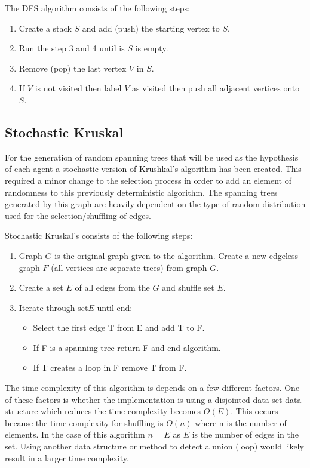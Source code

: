 \documentclass{AISB2008}
\begin{document}
The DFS algorithm consists of the following steps:

\begin{enumerate}
\item Create a stack {$S$} and add (push) the starting vertex to {$S$}.
\item Run the step 3 and 4 until is {$S$} is empty.
\item Remove (pop) the last vertex {$V$} in {$S$}.
\item If {$V$} is not visited then label {$V$} as visited then push all adjacent vertices onto {$S$}.
\end{enumerate}


\subsection{Stochastic Kruskal}
\label{stochastic kruskal}

For the generation of random spanning trees that will be used as the hypothesis of each agent a stochastic version of Krushkal’s algorithm has been created. This required a minor change to the selection process in order to add an element of randomness to this previously deterministic algorithm. The spanning trees generated by this graph are heavily dependent on the type of random distribution used for the selection/shuffling of edges.

Stochastic Kruskal’s consists of the following steps:

\begin{enumerate}
\item Graph {$G$} is the original graph given to the algorithm. Create a new edgeless graph {$F$} (all vertices are separate trees) from graph {$G$}.
\item Create a set {$E$} of all edges from the {$G$} and shuffle set {$E$}.
\item Iterate through set{$E$} until end:
\begin{itemize}
\item Select the first edge T from E and add T to F.
\item If F is a spanning tree return F and end algorithm.
\item If T creates a loop in F remove T from F.
\end{itemize}
\end{enumerate}

The time complexity of this algorithm is depends on a few different factors. One of these factors is whether the implementation is using a disjointed data set data structure which reduces the time complexity becomes {$O (E)$}. This occurs because the time complexity for shuffling is {$O (n)$} where n is the number of elements. In the case of this algorithm {$n = E$} as {$E$} is the number of edges in the set. Using another data structure or method to detect a union (loop) would likely result in a larger time complexity. 
\end{document}

